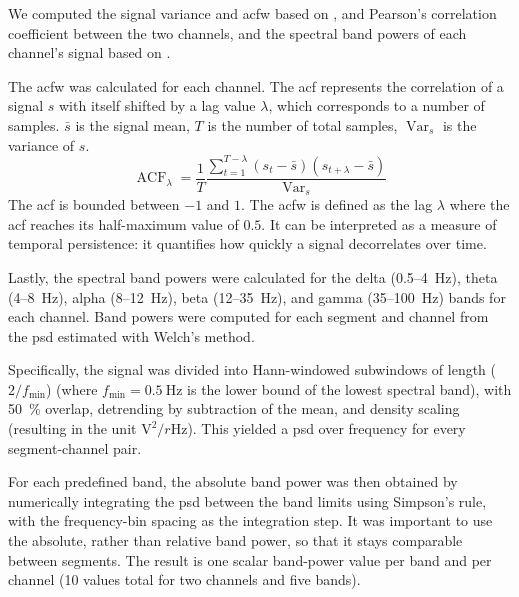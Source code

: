 We computed the signal variance and \gls{acfw} based on \textcite{maturana_critical_2020}, and Pearson's correlation coefficient between the two channels, and the spectral band powers of each channel's signal based on \textcite{muller_coherent_2022}.

The \gls{acfw} was calculated for each channel.
The \gls{acf} represents the correlation of a signal $s$ with itself shifted by a lag value $\lambda$, which corresponds to a number of samples.
$\bar{s}$ is the signal mean, $T$ is the number of total samples, $\operatorname{Var}_s$ is the variance of $s$.
\begin{equation}
    \label{eq:acf}
    \operatorname{ACF}_\lambda =
    \frac{1}{T} \frac    {\sum_{t=1}^{T-\lambda}\left(s_t-\bar{s}\right)\left(s_{t+\lambda}-\bar{s}\right)}{\operatorname{Var}_s}
\end{equation}
The \gls{acf} is bounded between $-1$ and $1$.
The \gls{acfw} is defined as the lag $\lambda$ where the \gls{acf} reaches its half-maximum value of $0.5$.
It can be interpreted as a measure of temporal persistence: it quantifies how quickly a signal decorrelates over time.

Lastly, the spectral band powers were calculated for the delta (0.5–\SI{4}{\Hz}), theta (4–\SI{8}{\Hz}), alpha (8–\SI{12}{\Hz}), beta (12–\SI{35}{\Hz}), and gamma (35–\SI{100}{\Hz}) bands for each channel.
Band powers were computed for each segment and channel from the \gls{psd} estimated with Welch’s method.

Specifically, the signal was divided into Hann-windowed subwindows of length ($2/f_{\min}$) (where $f_{\min}=\SI{0.5}{\Hz}$ is the lower bound of the lowest spectral band), with \SI{50}{\percent} overlap, detrending by subtraction of the mean, and density scaling (resulting in the unit $\si{\volt}^2 / r\si{\Hz}$).
This yielded a \gls{psd} over frequency for every segment-channel pair.

For each predefined band, the absolute band power was then obtained by numerically integrating the \gls{psd} between the band limits using Simpson’s rule, with the frequency-bin spacing as the integration step.
It was important to use the absolute, rather than relative band power, so that it stays comparable between segments.
The result is one scalar band-power value per band and per channel (10 values total for two channels and five bands).
